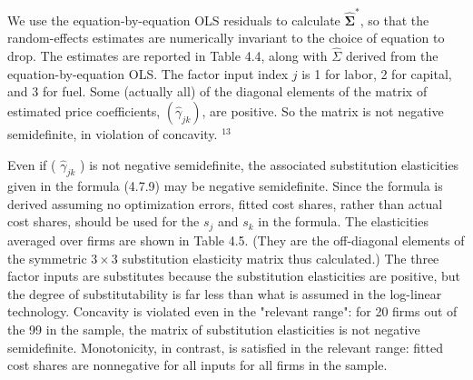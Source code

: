 \documentclass[10pt]{article}
\begin{document}
We use the equation-by-equation OLS residuals to calculate $\widehat{\mathbf{\Sigma}}^{*}$, so that the random-effects estimates are numerically invariant to the choice of equation to drop. The estimates are reported in Table 4.4, along with $\widehat{\Sigma}$ derived from the equation-by-equation OLS. The factor input index $j$ is 1 for labor, 2 for capital, and 3 for fuel. Some (actually all) of the diagonal elements of the matrix of estimated price coefficients, $\left(\hat{\gamma}_{j k}\right)$, are positive. So the matrix is not negative semidefinite, in violation of concavity. ${ }^{13}$

Even if ( $\widehat{\gamma}_{j k}$ ) is not negative semidefinite, the associated substitution elasticities given in the formula (4.7.9) may be negative semidefinite. Since the formula is derived assuming no optimization errors, fitted cost shares, rather than actual cost shares, should be used for the $s_{j}$ and $s_{k}$ in the formula. The elasticities averaged over firms are shown in Table 4.5. (They are the off-diagonal elements of the symmetric $3 \times 3$ substitution elasticity matrix thus calculated.) The three factor inputs are substitutes because the substitution elasticities are positive, but the degree of substitutability is far less than what is assumed in the log-linear technology. Concavity is violated even in the "relevant range": for 20 firms out of the 99 in the sample, the matrix of substitution elasticities is not negative semidefinite. Monotonicity, in contrast, is satisfied in the relevant range: fitted cost shares are nonnegative for all inputs for all firms in the sample.
\end{document}
